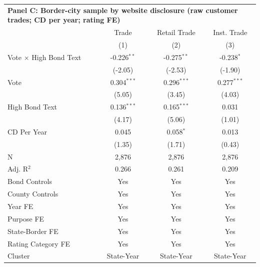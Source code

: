 \begingroup
\centering
\begin{tabular*}{\textwidth}{@{\extracolsep{\fill}}lccc}
\multicolumn{5}{l}{\textbf{Panel C: Border-city sample by website disclosure (raw customer trades; CD per year; rating FE)}}\\

\addlinespace
   \toprule
                                 & Trade         & Retail Trade  & Inst. Trade\\  
                                 & (1)           & (2)           & (3)\\  
   \midrule 
   Vote $\times$ High Bond Text  & -0.226$^{**}$ & -0.275$^{**}$ & -0.238$^{*}$\\   
                                 & (-2.05)      & (-2.53)      & (-1.90)\\   
   Vote                          & 0.304$^{***}$ & 0.296$^{***}$ & 0.277$^{***}$\\   
                                 & (5.05)       & (3.45)       & (4.03)\\   
   High Bond Text                & 0.136$^{***}$ & 0.165$^{***}$ & 0.031\\   
                                 & (4.17)       & (5.06)       & (1.01)\\   
   CD Per Year                   & 0.045         & 0.058$^{*}$   & 0.013\\   
                                 & (1.35)       & (1.71)       & (0.43)\\   
   \hline
   N                  & 2,876         & 2,876         & 2,876\\  
   Adj. R$^2$                & 0.266         & 0.261         & 0.209\\  
   Bond Controls                 & Yes           & Yes           & Yes\\  
   County Controls               & Yes           & Yes           & Yes\\  
   Year FE                       & Yes           & Yes           & Yes\\  
   Purpose FE                    & Yes           & Yes           & Yes\\  
   State-Border FE               & Yes           & Yes           & Yes\\  
   Rating Category FE            & Yes           & Yes           & Yes\\  
   Cluster              & State-Year & State-Year & State-Year\\  
   \bottomrule
\end{tabular*}
\par\endgroup
